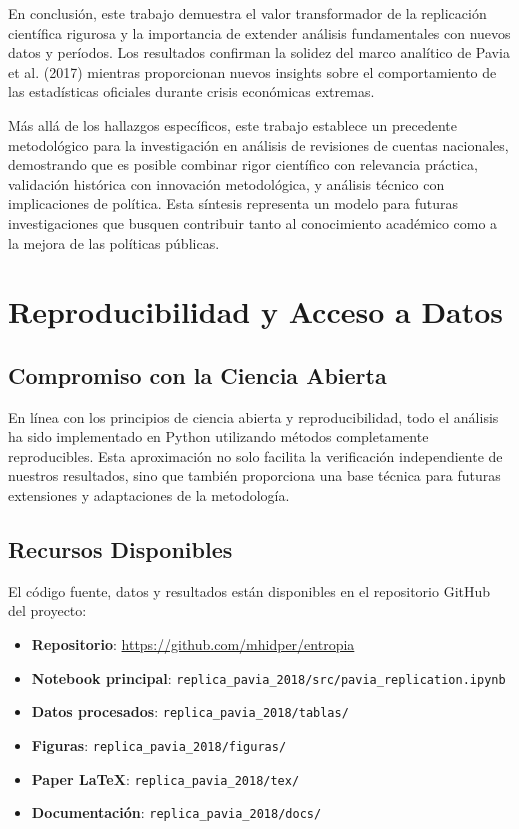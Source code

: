 \documentclass[12pt,a4paper]{article}
\begin{document}
En conclusión, este trabajo demuestra el valor transformador de la replicación científica rigurosa y la importancia de extender análisis fundamentales con nuevos datos y períodos. Los resultados confirman la solidez del marco analítico de Pavia et al. (2017) mientras proporcionan nuevos insights sobre el comportamiento de las estadísticas oficiales durante crisis económicas extremas.

Más allá de los hallazgos específicos, este trabajo establece un precedente metodológico para la investigación en análisis de revisiones de cuentas nacionales, demostrando que es posible combinar rigor científico con relevancia práctica, validación histórica con innovación metodológica, y análisis técnico con implicaciones de política. Esta síntesis representa un modelo para futuras investigaciones que busquen contribuir tanto al conocimiento académico como a la mejora de las políticas públicas.

\section{Reproducibilidad y Acceso a Datos}

\subsection{Compromiso con la Ciencia Abierta}

En línea con los principios de ciencia abierta y reproducibilidad, todo el análisis ha sido implementado en Python utilizando métodos completamente reproducibles. Esta aproximación no solo facilita la verificación independiente de nuestros resultados, sino que también proporciona una base técnica para futuras extensiones y adaptaciones de la metodología.

\subsection{Recursos Disponibles}

El código fuente, datos y resultados están disponibles en el repositorio GitHub del proyecto:

\begin{itemize}
\item \textbf{Repositorio}: \url{https://github.com/mhidper/entropia}
\item \textbf{Notebook principal}: \texttt{replica\_pavia\_2018/src/pavia\_replication.ipynb}
\item \textbf{Datos procesados}: \texttt{replica\_pavia\_2018/tablas/}
\item \textbf{Figuras}: \texttt{replica\_pavia\_2018/figuras/}
\item \textbf{Paper LaTeX}: \texttt{replica\_pavia\_2018/tex/}
\item \textbf{Documentación}: \texttt{replica\_pavia\_2018/docs/}
\end{itemize}
\end{document}
